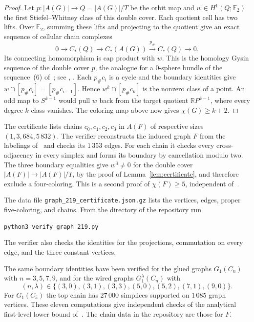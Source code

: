 \documentclass[11pt,a4paper]{article}
\newcommand{\F}{\mathbb{F}_2}
\newcommand{\RR}{\mathbb{R}}
\begin{document}
\begin{proof}
Let $p:|A(G)|\to Q=|A(G)|/T$ be the orbit map and $w\in H^1(Q;\F)$
the first Stiefel--Whitney class of this double cover. Each quotient cell
has two lifts. Over $\F$,
summing these lifts and projecting to the quotient give an exact
sequence of cellular chain complexes
\[
 0\longrightarrow C_*(Q)\longrightarrow C_*(A(G))
 \xrightarrow{p_\#} C_*(Q)\longrightarrow0 .
\]
Its connecting homomorphism is cap product with $w$. This is the homology
Gysin sequence of the double cover $p$, the analogue for a $0$-sphere
bundle of the sequence~(6) of~\cite{Z}; see
\cite[Chapter~5, \S 7]{Sp}, \cite[\S 12]{MS}. Each $p_\#c_i$ is a cycle and
the boundary identities give $w\cap[p_\#c_i]=[p_\#c_{i-1}]$.
Hence $w^k\cap[p_\#c_k]$ is the nonzero class of a point.
An odd map to $S^{k-1}$ would pull $w$ back from the target
quotient $\RR P^{k-1}$, where every degree-$k$ class vanishes.
The coloring map above now gives $\chi(G)\ge k+2$.
\end{proof}

The certificate lists chains $c_0,c_1,c_2,c_3$ in $A(F)$
of respective sizes $(1,3,684,5\,832)$. The verifier reconstructs
the induced graph $F$ from the labelings of~\cite[Section~3]{Z} and
checks its $1\,353$ edges. For each chain it checks every cross-adjacency
in every simplex and forms its boundary by cancellation modulo two. The
three boundary equalities give $w^3\ne0$ for the double cover
$|A(F)|\to |A(F)|/T$, by the proof of Lemma~\ref{lem:certificate}, and
therefore exclude a four-coloring. This is a second proof of
$\chi(F)\ge5$, independent of~\cite[Corollary~3.5]{Z}.

The data file \texttt{graph\_219\_certificate.json.gz} lists
the vertices, edges, proper five-coloring, and chains.
From the directory of the repository run
\begin{center}
  \texttt{python3 verify\_graph\_219.py}
\end{center}
The verifier also checks the identities for the projections, commutation
on every edge, and the three constant vertices.

The same boundary identities have been verified for the glued graphs
$G_1(C_n)$ with $n=3,5,7,9$, and for the wired graphs $G_1^\lambda(C_n)$
with
\[
 (n,\lambda)\in\{(3,0),(3,1),(3,3),(5,0),(5,2),(7,1),(9,0)\}.
\]
For $G_1(C_5)$ the top chain has $27\,000$ simplices supported on
$1\,085$ graph vertices. These eleven computations give independent
checks of the analytical first-level lower bound
of~\cite[Theorem~1.1]{Z}. The chain data in the repository are those for
$F$.
\end{document}
